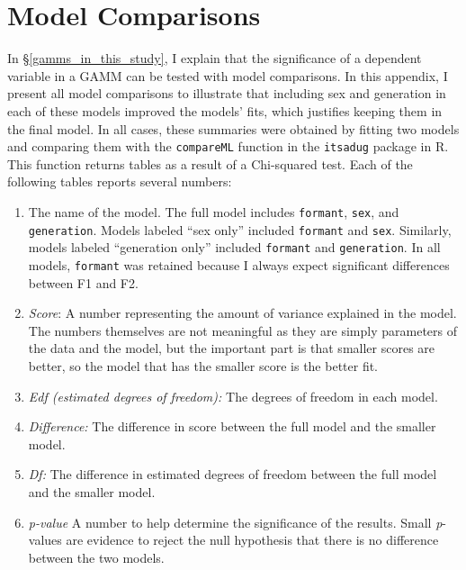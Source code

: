 \chapter{Model Comparisons}
\label{appendix:model_comarisons}


In \S\ref{gamms_in_this_study}, I explain that the significance of a dependent variable in a GAMM can be tested with model comparisons. In this appendix, I present all model comparisons to illustrate that including sex and generation in each of these models improved the models' fits, which justifies keeping them in the final model. In all cases, these summaries were obtained by fitting two models and comparing them with the \texttt{compareML} function in the \texttt{itsadug} package in R. This function returns tables as a result of a Chi-squared test. Each of the following tables reports several numbers:
\begin{enumerate}
    \item The name of the model. The full model includes \texttt{formant}, \texttt{sex}, and \texttt{generation}. Models labeled ``sex only'' included \texttt{formant} and \texttt{sex}. Similarly, models labeled ``generation only'' included \texttt{formant} and \texttt{generation}. In all models, \texttt{formant} was retained because I always expect significant differences between F1 and F2. 
    \item \textit{Score}: A number representing the amount of variance explained in the model. The numbers themselves are not meaningful as they are simply parameters of the data and the model, but the important part is that smaller scores are better, so the model that has the smaller score is the better fit.
    \item \textit{Edf (estimated degrees of freedom):} The degrees of freedom in each model.
    \item \textit{Difference:} The difference in score between the full model and the smaller model.
    \item \textit{Df:} The difference in estimated degrees of freedom between the full model and the smaller model.
    \item \textit{p-value} A number to help determine the significance of the results. Small \textit{p}-values are evidence to reject the null hypothesis that there is no difference between the two models.
\end{enumerate}






